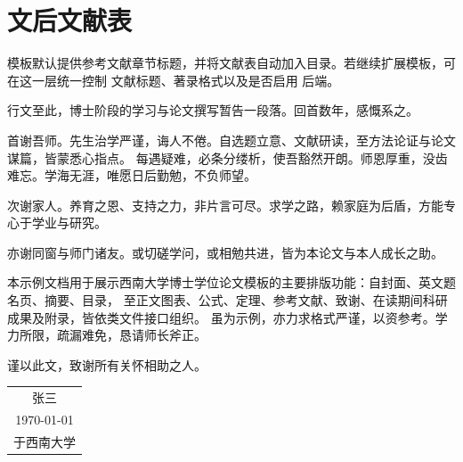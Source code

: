 \section{文后文献表}
模板默认提供参考文献章节标题，并将文献表自动加入目录。若继续扩展模板，可在这一层统一控制
文献标题、著录格式以及是否启用  后端。

\backmatter
\printbibliography[heading=bibintoc,title={参考文献}]

\begin{acknowledgements}
行文至此，博士阶段的学习与论文撰写暂告一段落。回首数年，感慨系之。

首谢吾师。先生治学严谨，诲人不倦。自选题立意、文献研读，至方法论证与论文谋篇，皆蒙悉心指点。
每遇疑难，必条分缕析，使吾豁然开朗。师恩厚重，没齿难忘。学海无涯，唯愿日后勤勉，不负师望。

次谢家人。养育之恩、支持之力，非片言可尽。求学之路，赖家庭为后盾，方能专心于学业与研究。

亦谢同窗与师门诸友。或切磋学问，或相勉共进，皆为本论文与本人成长之助。

本示例文档用于展示西南大学博士学位论文模板的主要排版功能：自封面、英文题名页、摘要、目录，
至正文图表、公式、定理、参考文献、致谢、在读期间科研成果及附录，皆依类文件接口组织。
虽为示例，亦力求格式严谨，以资参考。学力所限，疏漏难免，恳请师长斧正。

谨以此文，致谢所有关怀相助之人。

\vspace{\baselineskip}
\begin{flushright}
\begin{tabular}{c}
张三\\
\today\\
于西南大学
\end{tabular}
\end{flushright}
\end{acknowledgements}

